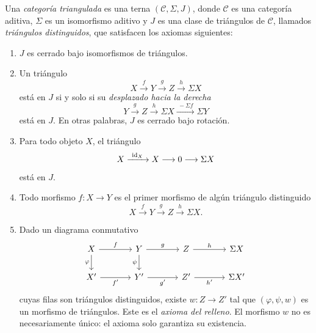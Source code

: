\begin{defi}\label{defi:triangulada}
Una \emph{categoría triangulada} es una terna $(\mathcal C,\Sigma,J)$, donde $\mathcal C$ es una categoría aditiva, $\Sigma$ es un isomorfismo aditivo y $J$ es una clase de triángulos de $\mathcal C$, llamados \emph{triángulos distinguidos}, que satisfacen los axiomas siguientes:
\begin{enumerate}[label = \textup{TR\arabic*.},leftmargin=2.5em]
\item $J$ es cerrado bajo isomorfismos de triángulos.

\item Un triángulo
\[
X\xrightarrow{\ f\ }Y\xrightarrow{\ g\ }Z\xrightarrow{\ h\ }\Sigma X
\]
está en $J$ si y solo si su \emph{desplazado hacia la derecha}
\[
Y\xrightarrow{\ g\ }Z\xrightarrow{\ h\ }\Sigma X\xrightarrow{\ -\Sigma f\ }\Sigma Y
\]
está en $J$. En otras palabras, $J$ es cerrado bajo rotación.

\item Para todo objeto $X$, el triángulo
\[
X\xrightarrow{\ \id_X\ }X\longrightarrow0\longrightarrow\Sigma X
\]
está en $J$.

\item Todo morfismo $f\colon X\to Y$ es el primer morfismo de algún triángulo distinguido
\[
X\xrightarrow{\ f\ }Y\xrightarrow{\ g\ }Z\xrightarrow{\ h\ }\Sigma X .
\]

\item Dado un diagrama conmutativo
\[
\begin{tikzcd}[column sep=large]
X \arrow[r,"f"] \arrow[d,"\varphi"'] & Y \arrow[r,"g"] \arrow[d,"\psi"'] & Z \arrow[r,"h"] & \Sigma X\\
X' \arrow[r,"f'"'] & Y' \arrow[r,"g'"'] & Z' \arrow[r,"h'"'] & \Sigma X'
\end{tikzcd}
\]
cuyas filas son triángulos distinguidos, existe $w\colon Z\to Z'$ tal que $(\varphi,\psi,w)$ es un morfismo de triángulos. Este es el \emph{axioma del relleno}. El morfismo $w$ no es necesariamente único: el axioma solo garantiza su existencia.


\end{enumerate}
\end{defi}
